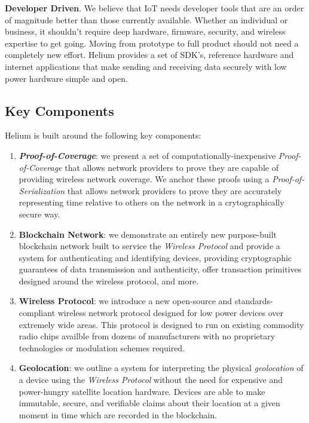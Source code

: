 \documentclass[letterpaper,11pt]{article}
\def\proofofcoverage/{\textit{Proof-of-Coverage}}
\begin{document}
\textbf{Developer Driven}. We believe that IoT needs developer tools that are an order of magnitude better than those currently available. Whether an individual or business, it shouldn't require deep hardware, firmware, security, and wireless expertise to get going. Moving from prototype to full product should not need a completely new effort. Helium provides a set of SDK's, reference hardware and internet applications that make sending and receiving data securely with low power hardware simple and open.

\subsection{Key Components}

Helium is built around the following key components:

\begin{enumerate}
  \item \textbf{\proofofcoverage/}: we present a set of computationally-inexpensive \proofofcoverage/ that allows network providers to prove they are capable of providing wireless network coverage. We anchor these proofs using a \textit{Proof-of-Serialization} that allows network providers to prove they are accurately representing time relative to others on the network in a crytographically secure way.
  
  \item \textbf{Blockchain Network}: we demonstrate an entirely new purpose-built blockchain network built to service the \textit{Wireless Protocol} and provide a system for authenticating and identifying devices, providing cryptographic guarantees of data transmission and authenticity, offer transaction primitives designed around the wireless protocol, and more.
  
	\item \textbf{Wireless Protocol}: we introduce a new open-source and standards-compliant wireless network protocol designed for low power devices over extremely wide areas. This protocol is designed to run on existing commodity radio chips availble from dozens of manufacturers with no proprietary technologies or modulation schemes required.
	
	\item \textbf{Geolocation}: we outline a system for interpreting the physical \textit{geolocation} of a device using the \textit{Wireless Protocol} without the need for expensive and power-hungry satellite location hardware. Devices are able to make immutable, secure, and verifiable claims about their location at a given moment in time which are recorded in the blockchain.
\end{enumerate}
\end{document}
